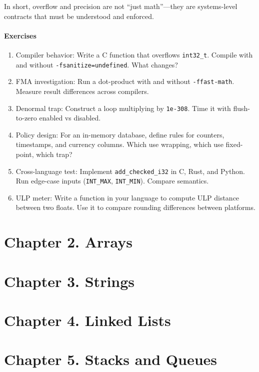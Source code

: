 \documentclass[
  letterpaper,
  DIV=11,
  numbers=noendperiod]{scrreprt}
\providecommand{\tightlist}{%
  \setlength{\itemsep}{0pt}\setlength{\parskip}{0pt}}
\begin{document}
In short, overflow and precision are not ``just math''---they are
systems-level contracts that must be understood and enforced.

\subsubsection{Exercises}\label{exercises-11}

\begin{enumerate}
\def\labelenumi{\arabic{enumi}.}
\tightlist
\item
  Compiler behavior: Write a C function that overflows
  \texttt{int32\_t}. Compile with and without
  \texttt{-fsanitize=undefined}. What changes?
\item
  FMA investigation: Run a dot-product with and without
  \texttt{-ffast-math}. Measure result differences across compilers.
\item
  Denormal trap: Construct a loop multiplying by \texttt{1e-308}. Time
  it with flush-to-zero enabled vs disabled.
\item
  Policy design: For an in-memory database, define rules for counters,
  timestamps, and currency columns. Which use wrapping, which use
  fixed-point, which trap?
\item
  Cross-language test: Implement \texttt{add\_checked\_i32} in C, Rust,
  and Python. Run edge-case inputs (\texttt{INT\_MAX},
  \texttt{INT\_MIN}). Compare semantics.
\item
  ULP meter: Write a function in your language to compute ULP distance
  between two floats. Use it to compare rounding differences between
  platforms.
\end{enumerate}


\chapter{Chapter 2. Arrays}\label{chapter-2.-arrays}


\chapter{Chapter 3. Strings}\label{chapter-3.-strings}


\chapter{Chapter 4. Linked Lists}\label{chapter-4.-linked-lists}


\chapter{Chapter 5. Stacks and
Queues}\label{chapter-5.-stacks-and-queues}
\end{document}
